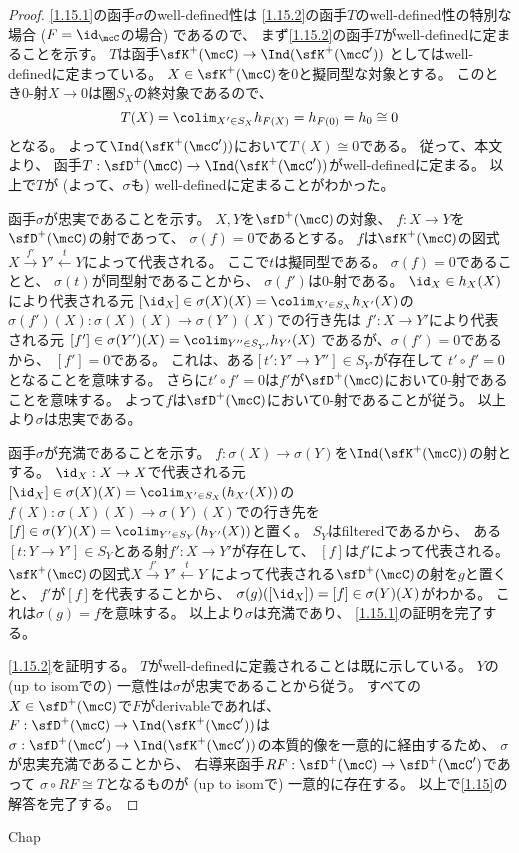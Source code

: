 \documentclass[uplatex,dvipdfmx]{jsarticle}
\begin{document}
\begin{proof}
  \ref{1.15.1}の函手\(\sigma\)のwell-defined性は
  \ref{1.15.2}の函手\(T\)のwell-defined性の特別な場合 (\(F=\id_{\mcC}\)の場合) であるので、
  まず\ref{1.15.2}の函手\(T\)がwell-definedに定まることを示す。
  \(T\)は函手\(\sfK^+(\mcC)\to \Ind(\sfK^+(\mcC'))\)
  としてはwell-definedに定まっている。
  \(X\in \sfK^+(\mcC)\)を\(0\)と擬同型な対象とする。
  このとき\(0\)-射\(X\to 0\)は圏\(S_X\)の終対象であるので、
  \[T(X) = \colim_{X'\in S_X}h_{F(X)} = h_{F(0)} = h_0 \cong 0\]
  となる。
  よって\(\Ind(\sfK^+(\mcC'))\)において\(T(X)\cong 0\)である。
  従って、本文\cite[Proposition1.6.9 (iii)]{kashiwara2002sheaves}より、
  函手\(T:\sfD^+(\mcC)\to \Ind(\sfK^+(\mcC'))\)がwell-definedに定まる。
  以上で\(T\)が (よって、\(\sigma\)も) well-definedに定まることがわかった。

  函手\(\sigma\)が忠実であることを示す。
  \(X,Y\)を\(\sfD^+(\mcC)\)の対象、
  \(f:X\to Y\)を\(\sfD^+(\mcC)\)の射であって、
  \(\sigma(f) = 0\)であるとする。
  \(f\)は\(\sfK^+(\mcC)\)の図式
  \(X\xrightarrow{f'} Y' \xleftarrow{t} Y\)によって代表される。
  ここで\(t\)は擬同型である。
  \(\sigma(f) = 0\)であることと、
  \(\sigma(t)\)が同型射であることから、
  \(\sigma(f')\)は\(0\)-射である。
  \(\id_X\in h_X(X)\)により代表される元
  \([\id_X]\in \sigma(X)(X) = \colim_{X'\in S_X}h_{X'}(X)\)の
  \(\sigma(f')(X): \sigma(X)(X)\to \sigma(Y')(X)\)での行き先は
  \(f':X\to Y'\)により代表される元
  \([f']\in \sigma(Y')(X) = \colim_{Y''\in S_{Y'}}h_{Y'}(X)\)
  であるが、\(\sigma(f') = 0\)であるから、
  \([f']=0\)である。
  これは、ある\([t':Y'\to Y'']\in S_{Y'}\)が存在して
  \(t'\circ f' = 0\)となることを意味する。
  さらに\(t'\circ f' = 0\)は\(f'\)が\(\sfD^+(\mcC)\)において\(0\)-射であることを意味する。
  よって\(f\)は\(\sfD^+(\mcC)\)において\(0\)-射であることが従う。
  以上より\(\sigma\)は忠実である。

  函手\(\sigma\)が充満であることを示す。
  \(f:\sigma(X)\to \sigma(Y)\)を\(\Ind(\sfK^+(\mcC))\)の射とする。
  \(\id_X:X\to X\)で代表される元
  \([\id_X]\in \sigma(X)(X) = \colim_{X'\in S_X}(h_{X'}(X))\)の
  \(f(X):\sigma(X)(X)\to \sigma(Y)(X)\)での行き先を
  \([f]\in \sigma(Y)(X) = \colim_{Y'\in S_Y}(h_{Y'}(X))\)と置く。
  \(S_Y\)はfilteredであるから、
  ある\([t:Y\to Y']\in S_Y\)とある射\(f':X\to Y'\)が存在して、
  \([f]\)は\(f'\)によって代表される。
  \(\sfK^+(\mcC)\)の図式\(X\xrightarrow{f'}Y' \xleftarrow{t} Y\)
  によって代表される\(\sfD^+(\mcC)\)の射を\(g\)と置くと、
  \(f'\)が\([f]\)を代表することから、
  \(\sigma(g)([\id_X]) = [f]\in \sigma(Y)(X)\)がわかる。
  これは\(\sigma(g) = f\)を意味する。
  以上より\(\sigma\)は充満であり、
  \ref{1.15.1}の証明を完了する。

  \ref{1.15.2}を証明する。
  \(T\)がwell-definedに定義されることは既に示している。
  \(Y\)の (up to isomでの) 一意性は\(\sigma\)が忠実であることから従う。
  すべての\(X\in \sfD^+(\mcC)\)で\(F\)がderivableであれば、
  \(F:\sfD^+(\mcC)\to \Ind(\sfK^+(\mcC'))\)は
  \(\sigma:\sfD^+(\mcC')\to \Ind(\sfK^+(\mcC'))\)の本質的像を一意的に経由するため、
  \(\sigma\)が忠実充満であることから、
  右導来函手\(RF:\sfD^+(\mcC)\to \sfD^+(\mcC')\)であって
  \(\sigma\circ RF \cong T\)となるものが (up to isomで) 一意的に存在する。
  以上で\autoref{1.15}の解答を完了する。
\end{proof}







\ifcsname Chap\endcsname\else
\printbibliography
\end{document}
